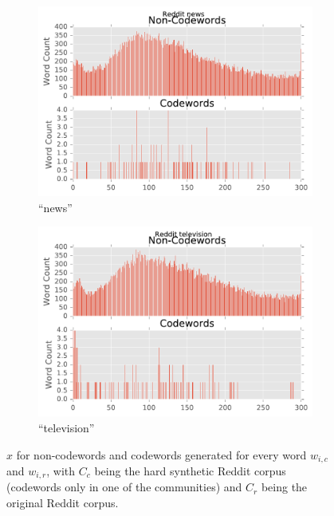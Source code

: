 \begin{figure}[H]
\begin{subfigure}[t]{.4\textwidth}
\centering\includegraphics[]{figures/reddit-news-count.pdf}
\caption{``news''}
\label{fig-reddit-news-count}
\end{subfigure}
\begin{subfigure}[t]{.4\textwidth}
\centering\includegraphics[]{figures/reddit-television-count.pdf}
\caption{``television''}
\label{fig-reddit-television-count}
\end{subfigure}
\caption{$x$ for non-codewords and codewords generated for every word $w_{i, c}$ and $w_{i, r}$, with $C_c$ being the hard synthetic Reddit corpus (codewords only in one of the communities) and $C_r$ being the original Reddit corpus.}
\label{fig-reddit-community-count}
\end{figure}


